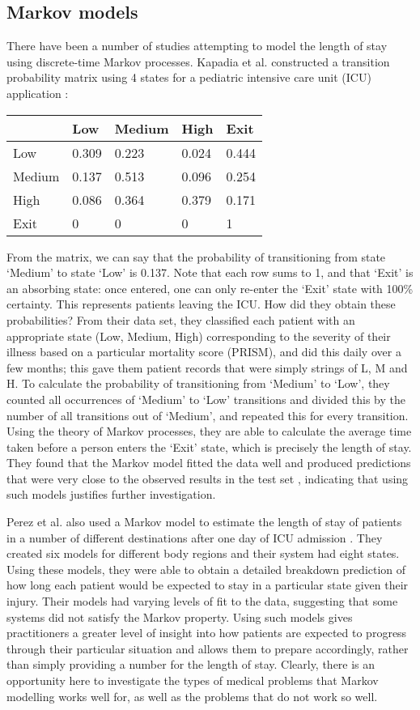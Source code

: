 \subsection{Markov models}
There have been a number of studies attempting to model the length of stay
using discrete-time Markov processes. Kapadia et al. constructed a transition
probability matrix using 4 states for a pediatric intensive care unit (ICU)
application \citep{Kapadia2000}:
\begin{center}
\begin{tabular}{l|llll}
& Low & Medium & High & Exit \\
\hline
Low & 0.309 & 0.223 & 0.024 & 0.444 \\
Medium & 0.137 & 0.513 & 0.096 & 0.254 \\
High & 0.086 & 0.364 & 0.379 & 0.171 \\
Exit & 0 & 0 & 0 & 1 \\
\end{tabular}
\end{center}
From the matrix, we can say that the probability of transitioning from state
`Medium' to state `Low' is 0.137. Note that each row sums to 1, and that `Exit'
is an absorbing state: once entered, one can only re-enter the `Exit' state
with 100\% certainty. This represents patients leaving the ICU. How did they
obtain these probabilities? From their data set, they classified each patient
with an appropriate state (Low, Medium, High) corresponding to the severity of
their illness based on a particular mortality score (PRISM), and did this daily
over a few months; this gave them patient records that were simply strings of
L, M and H. To calculate the probability of transitioning from `Medium' to
`Low', they counted all occurrences of `Medium' to `Low' transitions and
divided this by the number of all transitions out of `Medium', and repeated
this for every transition. Using the theory of Markov processes, they are able
to calculate the average time taken before a person enters the `Exit' state,
which is precisely the length of stay. They found that the Markov model fitted
the data well and produced predictions that were very close to the observed
results in the test set \citep{Kapadia2000}, indicating that using such models
justifies further investigation.

Perez et al. also used a Markov model to estimate the length of stay of
patients in a number of different destinations after one day of ICU admission
 \citep{Perez2006}. They created six models for different body regions and their
system had eight states. Using these models, they were able to obtain a
detailed breakdown prediction of how long each patient would be expected to
stay in a particular state given their injury. Their models had varying levels
of fit to the data, suggesting that some systems did not satisfy the Markov
property. Using such models gives practitioners a greater level of insight
into how patients are expected to progress through their particular situation
and allows them to prepare accordingly, rather than simply providing a number
for the length of stay. Clearly, there is an opportunity here to investigate
the types of medical problems that Markov modelling works well for, as well as
the problems that do not work so well.

